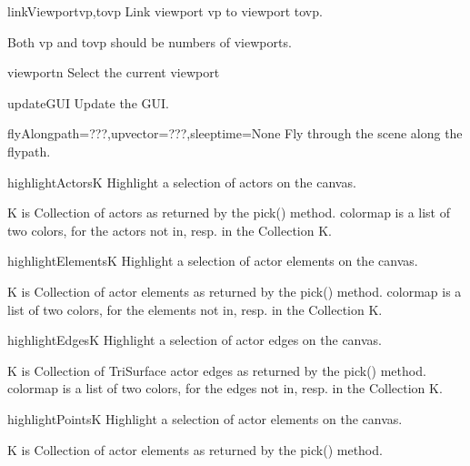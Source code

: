 \begin{funcdesc}{linkViewport}{vp,tovp}
Link viewport vp to viewport tovp.

    Both vp and tovp should be numbers of viewports. 
    

\end{funcdesc}


\begin{funcdesc}{viewport}{n}
Select the current viewport

\end{funcdesc}


\begin{funcdesc}{updateGUI}{}
Update the GUI.

\end{funcdesc}


\begin{funcdesc}{flyAlong}{path=???,upvector=???,sleeptime=None}
Fly through the scene along the flypath.

\end{funcdesc}


\begin{funcdesc}{highlightActors}{K}
Highlight a selection of actors on the canvas.

    K is Collection of actors as returned by the pick() method.
    colormap is a list of two colors, for the actors not in, resp. in
    the Collection K.
    

\end{funcdesc}


\begin{funcdesc}{highlightElements}{K}
Highlight a selection of actor elements on the canvas.

    K is Collection of actor elements as returned by the pick() method.
    colormap is a list of two colors, for the elements not in, resp. in
    the Collection K.
    

\end{funcdesc}


\begin{funcdesc}{highlightEdges}{K}
Highlight a selection of actor edges on the canvas.

    K is Collection of TriSurface actor edges as returned by the pick() method.
    colormap is a list of two colors, for the edges not in, resp. in
    the Collection K.
    

\end{funcdesc}


\begin{funcdesc}{highlightPoints}{K}
Highlight a selection of actor elements on the canvas.

    K is Collection of actor elements as returned by the pick() method.
    

\end{funcdesc}


